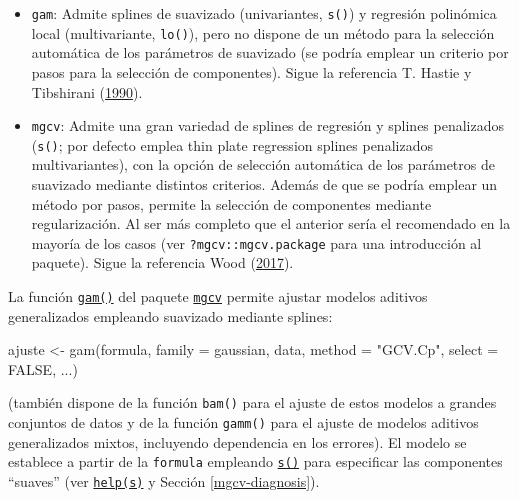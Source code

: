 \documentclass[
]{book}
\newenvironment{Shaded}{\begin{snugshade}}{\end{snugshade}}
\newcommand{\AttributeTok}[1]{\textcolor[rgb]{0.77,0.63,0.00}{#1}}
\newcommand{\ConstantTok}[1]{\textcolor[rgb]{0.00,0.00,0.00}{#1}}
\newcommand{\FunctionTok}[1]{\textcolor[rgb]{0.00,0.00,0.00}{#1}}
\newcommand{\NormalTok}[1]{#1}
\newcommand{\OtherTok}[1]{\textcolor[rgb]{0.56,0.35,0.01}{#1}}
\newcommand{\StringTok}[1]{\textcolor[rgb]{0.31,0.60,0.02}{#1}}
\theoremstyle{break}
\theoremstyle{nonumberplain}
\begin{document}
\begin{itemize}
\item
  \texttt{gam}: Admite splines de suavizado (univariantes, \texttt{s()}) y regresión polinómica local (multivariante, \texttt{lo()}), pero no dispone de un método para la selección automática de los parámetros de suavizado (se podría emplear un criterio por pasos para la selección de componentes).
  Sigue la referencia T. Hastie y Tibshirani (\protect\hyperlink{ref-hastie1990generalized}{1990}).
\item
  \texttt{mgcv}: Admite una gran variedad de splines de regresión y splines penalizados (\texttt{s()}; por defecto emplea thin plate regression splines penalizados multivariantes), con la opción de selección automática de los parámetros de suavizado mediante distintos criterios.
  Además de que se podría emplear un método por pasos, permite la selección de componentes mediante regularización.
  Al ser más completo que el anterior sería el recomendado en la mayoría de los casos (ver \texttt{?mgcv::mgcv.package} para una introducción al paquete).
  Sigue la referencia Wood (\protect\hyperlink{ref-wood2017generalized}{2017}).
\end{itemize}

La función \href{https://rdrr.io/pkg/mgcv/man/gam.html}{\texttt{gam()}} del paquete \href{https://CRAN.R-project.org/package=mgcv}{\texttt{mgcv}} permite ajustar modelos aditivos generalizados empleando suavizado mediante splines:

\begin{Shaded}
\begin{Highlighting}[]
\NormalTok{ajuste }\OtherTok{\textless{}{-}} \FunctionTok{gam}\NormalTok{(formula, }\AttributeTok{family =}\NormalTok{ gaussian, data, }\AttributeTok{method =} \StringTok{"GCV.Cp"}\NormalTok{, }\AttributeTok{select =} \ConstantTok{FALSE}\NormalTok{, ...)}
\end{Highlighting}
\end{Shaded}

(también dispone de la función \texttt{bam()} para el ajuste de estos modelos a grandes conjuntos de datos y de la función \texttt{gamm()} para el ajuste de modelos aditivos generalizados mixtos, incluyendo dependencia en los errores).
El modelo se establece a partir de la \texttt{formula} empleando \href{https://rdrr.io/pkg/mgcv/man/s.html}{\texttt{s()}} para especificar las componentes ``suaves'' (ver \href{https://rdrr.io/pkg/mgcv/man/s.html}{\texttt{help(s)}} y Sección \ref{mgcv-diagnosis}).
\end{document}
